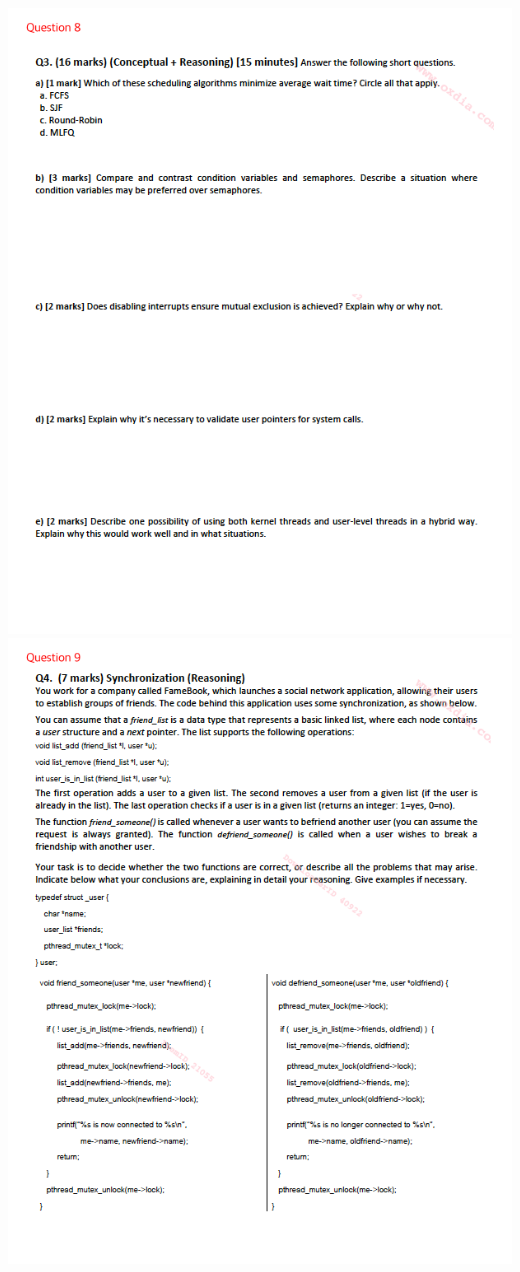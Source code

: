 \documentclass[12pt]{article}
\begin{document}
\begin{center}
    \includegraphics[width=\linewidth]{../images/midterm_5_8.png}
    \includegraphics[width=\linewidth]{../images/midterm_5_9.png}

\end{center}
\end{document}
